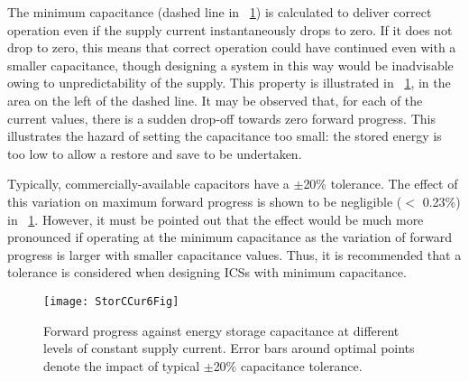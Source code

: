 The minimum capacitance (dashed line in \figurename{~\ref{fig:fpwconstcurr}}) is calculated to deliver correct operation even if the supply current instantaneously drops to zero. If it does not drop to zero, this means that correct operation could have continued even with a smaller capacitance, though designing a system in this way would be inadvisable owing to unpredictability of the supply. This property is illustrated in \figurename{~\ref{fig:fpwconstcurr}}, in the area on the left of the dashed line. It may be observed that, for each of the current values, there is a sudden drop-off towards zero forward progress. This illustrates the hazard of setting the capacitance too small: the stored energy is too low to allow a restore and save to be undertaken.
 
Typically, commercially-available capacitors have a $\pm$20\% tolerance. The effect of this variation on maximum forward progress is shown to be negligible ($<$ 0.23\%) in \figurename{~\ref{fig:fpwconstcurr}}. However, it must be pointed out that the effect would be much more pronounced if operating at the minimum capacitance as the variation of forward progress is larger with smaller capacitance values. Thus, it is recommended that a tolerance is considered when designing ICSs with minimum capacitance.



\begin{figure}[!t]
  \centering
  \texttt{[image: StorCCur6Fig]} 
  \caption{Forward progress against energy storage capacitance at different levels of constant supply current. Error bars around optimal points denote the impact of typical $\pm$20\% capacitance tolerance. }
  \label{fig:fpwconstcurr}
\end{figure}

